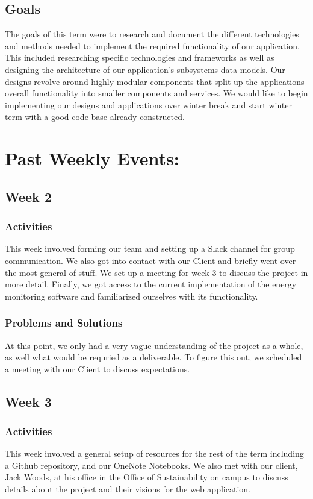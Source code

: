 \documentclass[journal,10pt,onecolumn,compsoc]{IEEEtran} \usepackage[margin=1.0in]{geometry} \usepackage{pdfpages}
\begin{document}
    \subsection{Goals}
    The goals of this term were to research and document the different technologies and methods needed to implement the required functionality of our application. This included researching specific technologies and frameworks as well as designing the architecture of our application's subsystems data models. Our designs revolve around highly modular components that split up the applications overall functionality into smaller components and services. We would like to begin implementing our designs and applications over winter break and start winter term with a good code base already constructed.
    
    \section{Past Weekly Events:}
    \subsection{Week 2}
    \subsubsection{Activities} 
    This week involved forming our team and setting up a Slack channel for group communication. We also got into contact with our Client and briefly went over the most general of stuff. We set up a meeting for week 3 to discuss the project in more detail. Finally, we got access to the current implementation of the energy monitoring software and familiarized ourselves with its functionality.
    \subsubsection{Problems and Solutions} 
	At this point, we only had a very vague understanding of the project as a whole, as well what would be requried as a deliverable. To figure this out, we scheduled a meeting with our Client to discuss expectations.
    \subsection{Week 3}
    \subsubsection{Activities} 
    This week involved a general setup of resources for the rest of the term including a Github repository, and our OneNote Notebooks. We also met with our client, Jack Woods, at his office in the Office of Sustainability on campus to discuss details about the project and their visions for the web application.
\end{document}
